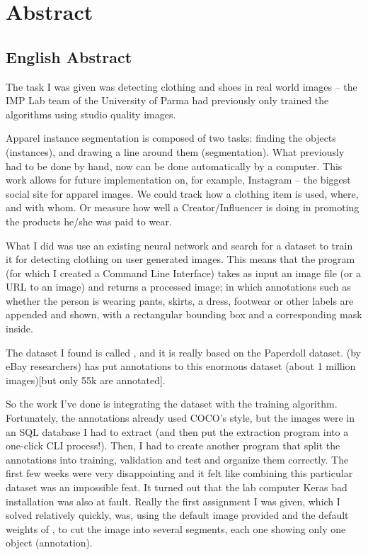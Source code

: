 \chapter*{Abstract}
\section*{English Abstract}

The task I was given was detecting clothing and shoes in real world images -- the IMP Lab team of the University of Parma had previously only trained the algorithms using studio quality images.

Apparel instance segmentation is composed of two tasks: finding the objects (instances), and drawing a line around them (segmentation). What previously had to be done by hand, now can be done automatically by a computer. This work allows for future implementation on, for example, Instagram -- the biggest social site for apparel images. We could track how a clothing item is used, where, and with whom. Or measure how well a Creator/Influencer is doing in promoting the products he/she was paid to wear.

What I did was use an existing neural network and search for a dataset to train it for detecting clothing on user generated images. This means that the program (for which I created a Command Line Interface) takes as input an image file (or a URL to an image) and returns a processed image; in which annotations such as whether the person is wearing pants, skirts, a dress, footwear or other labels are appended and shown, with a rectangular bounding box and a corresponding mask inside.

The dataset I found is called \modanet, and it is really based on the Paperdoll dataset. \modanet (by eBay researchers) has put annotations to this enormous dataset (about 1 million images)[but only 55k are annotated].

So the work I've done is integrating the dataset with the training algorithm. Fortunately, the \modanet annotations already used COCO's style, but the images were in an SQL database I had to extract (and then put the extraction program into a one-click CLI process!).
Then, I had to create another program that split the annotations into training, validation and test and organize them correctly. The first few weeks were very disappointing and it felt like combining this particular dataset was an impossible feat. It turned out that the lab computer Keras bad installation was also at fault.
Really the first assignment I was given, which I solved relatively quickly, was, using the default image provided and the default weights of \maskrcnn, to cut the image into several segments, each one showing only one object (annotation).

